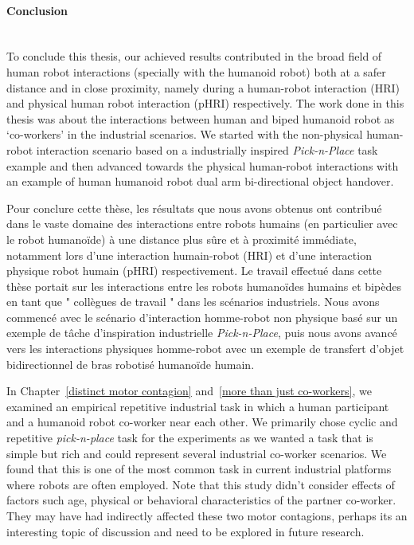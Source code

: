 \paragraph*{\LARGE {Conclusion \\}\\}

To conclude this thesis, our achieved results contributed in the broad field of human robot interactions (specially with the humanoid robot) both at a safer distance and in close proximity, namely during a human-robot interaction (HRI) and physical human robot interaction (pHRI) respectively. The work done in this thesis was about the interactions between human and biped humanoid robot as `co-workers' in the industrial scenarios. We started with the non-physical human-robot interaction scenario based on a industrially inspired \textit{Pick-n-Place} task example and then advanced towards the physical human-robot interactions with an example of human humanoid robot dual arm bi-directional object handover.

Pour conclure cette thèse, les résultats que nous avons obtenus ont contribué dans le vaste domaine des interactions entre robots humains (en particulier avec le robot humanoïde) à une distance plus sûre et à proximité immédiate, notamment lors d'une interaction humain-robot (HRI) et d'une interaction physique robot humain (pHRI) respectivement. Le travail effectué dans cette thèse portait sur les interactions entre les robots humanoïdes humains et bipèdes en tant que " collègues de travail " dans les scénarios industriels. Nous avons commencé avec le scénario d'interaction homme-robot non physique basé sur un exemple de tâche d'inspiration industrielle \textit{Pick-n-Place}, puis nous avons avancé vers les interactions physiques homme-robot avec un exemple de transfert d'objet bidirectionnel de bras robotisé humanoïde humain.


 
In Chapter~\ref{distinct motor contagion} and~\ref{more than just co-workers}, we examined an empirical repetitive industrial task in which a human participant and a humanoid robot co-worker near each other. We primarily chose cyclic and repetitive \textit{pick-n-place} task for the experiments as we wanted a task that is simple but rich and could represent several industrial co-worker scenarios. We found that this is one of the most common task in current industrial platforms where robots are often employed. Note that this study didn't consider effects of factors such age, physical or behavioral characteristics of the partner co-worker. They may have had indirectly affected these two motor contagions, perhaps its an interesting topic of discussion and need to be explored in future research.


